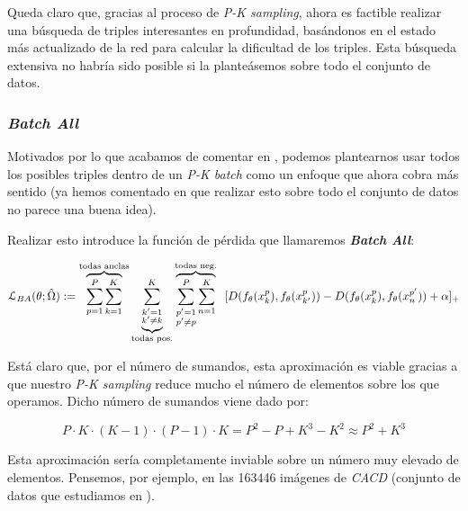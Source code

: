Queda claro que, gracias al proceso de \textit{P-K sampling}, ahora es factible realizar una búsqueda de triples interesantes en profundidad, basándonos en el estado más actualizado de la red para calcular la dificultad de los triples. Esta búsqueda extensiva no habría sido posible si la planteásemos sobre todo el conjunto de datos.

\subsubsection{\textit{Batch All}} \label{isubsubs:batch_all}

Motivados por lo que acabamos de comentar en , podemos plantearnos usar todos los posibles triples dentro de un \textit{P-K batch} como un enfoque que ahora cobra más sentido (ya hemos comentado en  que realizar esto sobre todo el conjunto de datos no parece una buena idea).

Realizar esto introduce la función de pérdida que llamaremos \textbf{\textit{Batch All}}:

\begin{equation} \label{ieq:batch_all}
    \mathcal{L}_{BA}(\theta; \hat{\Omega}) :=
    \overbrace{\sum_{p = 1}^{P} \sum_{k = 1}^K}^\textrm{\text{todas anclas}}
    \underbrace{\sum_{\substack{k' = 1 \\ k' \neq k}}^{K}}_\textrm{\text{todas pos.}}
    \overbrace{\sum_{\substack{p' = 1 \\ p' \neq p}}^P \sum_{n = 1}^K}^\textrm{\text{todas neg.}} \ \ [
        D(f_{\theta}(x_k^p),f_{\theta}(x_{k'}^p)) - D(f_{\theta}(x_k^p),f_{\theta}(x_{n}^{p'})) + \alpha
    ]_+
\end{equation}

Está claro que, por el número de sumandos, esta aproximación es viable gracias a que nuestro \textit{P-K sampling} reduce mucho el número de elementos sobre los que operamos. Dicho número de sumandos viene dado por:

\begin{equation}
    P \cdot K \cdot (K - 1) \cdot (P - 1) \cdot K = P^2 - P + K^3 - K^2 \approx P^2 + K^3
\end{equation}

Esta aproximación sería completamente inviable sobre un número muy elevado de elementos. Pensemos, por ejemplo, en las 163446 imágenes de \textit{CACD} (conjunto de datos que estudiamos en ).

